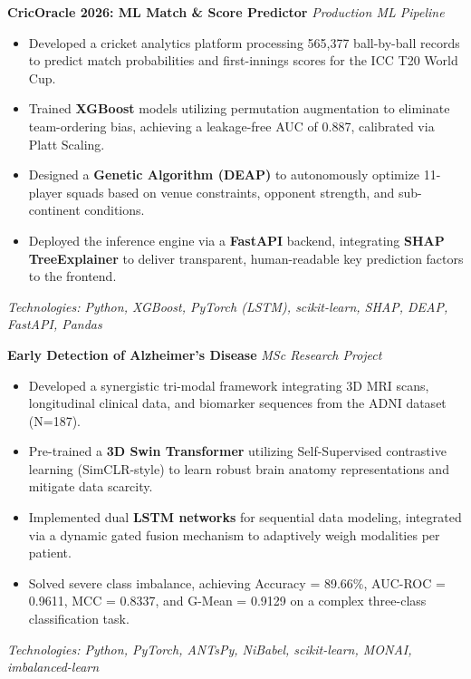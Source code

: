 \documentclass[a4paper,10pt]{article}
\begin{document}
\noindent\textbf{CricOracle 2026: ML Match \& Score Predictor} \hfill \textit{Production ML Pipeline}
\begin{itemize}[leftmargin=*, topsep=4pt, itemsep=2pt]
    \item Developed a cricket analytics platform processing 565,377 ball-by-ball records to predict match probabilities and first-innings scores for the ICC T20 World Cup.
    \item Trained \textbf{XGBoost} models utilizing permutation augmentation to eliminate team-ordering bias, achieving a leakage-free AUC of 0.887, calibrated via Platt Scaling.
    \item Designed a \textbf{Genetic Algorithm (DEAP)} to autonomously optimize 11-player squads based on venue constraints, opponent strength, and sub-continent conditions.
    \item Deployed the inference engine via a \textbf{FastAPI} backend, integrating \textbf{SHAP TreeExplainer} to deliver transparent, human-readable key prediction factors to the frontend.
\end{itemize}
\textit{Technologies: Python, XGBoost, PyTorch (LSTM), scikit-learn, SHAP, DEAP, FastAPI, Pandas}
\vspace{8pt}

\noindent\textbf{Early Detection of Alzheimer’s Disease} \hfill \textit{MSc Research Project}
\begin{itemize}[leftmargin=*, topsep=4pt, itemsep=2pt]
    \item Developed a synergistic tri-modal framework integrating 3D MRI scans, longitudinal clinical data, and biomarker sequences from the ADNI dataset (N=187).
    \item Pre-trained a \textbf{3D Swin Transformer} utilizing Self-Supervised contrastive learning (SimCLR-style) to learn robust brain anatomy representations and mitigate data scarcity.
    \item Implemented dual \textbf{LSTM networks} for sequential data modeling, integrated via a dynamic gated fusion mechanism to adaptively weigh modalities per patient.
    \item Solved severe class imbalance, achieving Accuracy = 89.66\%, AUC-ROC = 0.9611, MCC = 0.8337, and G-Mean = 0.9129 on a complex three-class classification task.
\end{itemize}
\textit{Technologies: Python, PyTorch, ANTsPy, NiBabel, scikit-learn, MONAI, imbalanced-learn}
\vspace{8pt}
\end{document}
